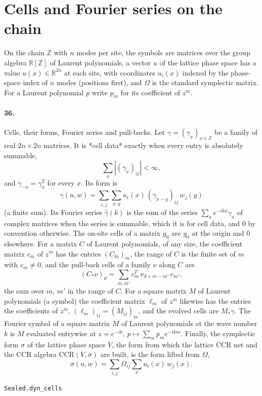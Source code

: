 \documentclass[11pt]{article}
\begin{document}
\section*{Cells and Fourier series on the chain}
On the chain $\mathbb Z$ with $n$ modes per site, the symbols are matrices over the group algebra $\mathbb R[\mathbb Z]$ of Laurent polynomials, a vector $u$ of the lattice phase space has a value $u(x) \in \mathbb R^{2n}$ at each site, with coordinates $u_i(x)$ indexed by the phase-space index of $n$ modes (positions first), and $\Omega$ is the standard symplectic matrix. For a Laurent polynomial $p$ write $p_m$ for its coefficient of $z^m$.

\paragraph{36.} Cells, their forms, Fourier series and pull-backs. Let $\gamma = (\gamma_x)_{x \in \mathbb Z}$ be a family of real $2n \times 2n$ matrices. It is *cell data* exactly when every entry is absolutely summable, \[\sum_x |(\gamma_x)_{ij}| < \infty,\] and $\gamma_{-x} = \gamma_x^T$ for every $x$. Its form is \[\gamma(u, w) = \sum_{i, j} \sum_{x, y} u_i(x)\, (\gamma_{x - y})_{ij}\, w_j(y)\] (a finite sum). Its Fourier series $\hat\gamma(k)$ is the sum of the series $\sum_x e^{-ikx} \gamma_x$ of complex matrices when the series is summable, which it is for cell data, and $0$ by convention otherwise. The on-site cells of a matrix $g_0$ are $g_0$ at the origin and $0$ elsewhere. For a matrix $C$ of Laurent polynomials, of any size, the coefficient matrix $c_m$ of $z^m$ has the entries $(C_{ki})_m$, the range of $C$ is the finite set of $m$ with $c_m \neq 0$, and the pull-back cells of a family $\nu$ along $C$ are \[(C_* \nu)_d = \sum_{m, m'} c_m^T\, \nu_{d + m - m'}\, c_{m'},\] the sum over $m$, $m'$ in the range of $C$. For a square matrix $M$ of Laurent polynomials (a symbol) the coefficient matrix $\ell_m$ of $z^m$ likewise has the entries the coefficients of $z^m$, $(\ell_m)_{ij} = (M_{ij})_m$, and the evolved cells are $M_* \gamma$. The Fourier symbol of a square matrix $M$ of Laurent polynomials at the wave number $k$ is $M$ evaluated entrywise at $z = e^{-ik}$, $p \mapsto \sum_m p_m e^{-ikm}$. Finally, the symplectic form $\sigma$ of the lattice phase space $V$, the form from which the lattice CCR net and the CCR algebra $\mathrm{CCR}(V, \sigma)$ are built, is the form lifted from $\Omega$, \[\sigma(u, w) = \sum_{i, j} \Omega_{ij} \sum_x u_i(x)\, w_j(x).\]\par{\footnotesize\texttt{Sealed.dyn\_cells}}
\end{document}

